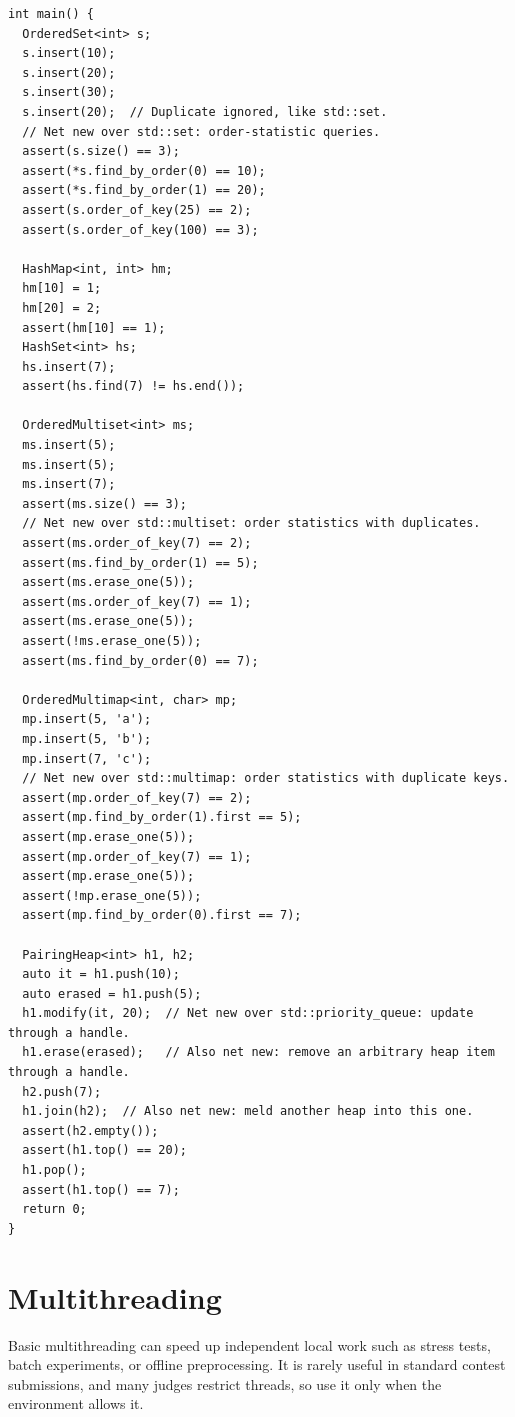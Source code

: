 \begin{lstlisting}[style=cpp]
int main() {
  OrderedSet<int> s;
  s.insert(10);
  s.insert(20);
  s.insert(30);
  s.insert(20);  // Duplicate ignored, like std::set.
  // Net new over std::set: order-statistic queries.
  assert(s.size() == 3);
  assert(*s.find_by_order(0) == 10);
  assert(*s.find_by_order(1) == 20);
  assert(s.order_of_key(25) == 2);
  assert(s.order_of_key(100) == 3);

  HashMap<int, int> hm;
  hm[10] = 1;
  hm[20] = 2;
  assert(hm[10] == 1);
  HashSet<int> hs;
  hs.insert(7);
  assert(hs.find(7) != hs.end());

  OrderedMultiset<int> ms;
  ms.insert(5);
  ms.insert(5);
  ms.insert(7);
  assert(ms.size() == 3);
  // Net new over std::multiset: order statistics with duplicates.
  assert(ms.order_of_key(7) == 2);
  assert(ms.find_by_order(1) == 5);
  assert(ms.erase_one(5));
  assert(ms.order_of_key(7) == 1);
  assert(ms.erase_one(5));
  assert(!ms.erase_one(5));
  assert(ms.find_by_order(0) == 7);

  OrderedMultimap<int, char> mp;
  mp.insert(5, 'a');
  mp.insert(5, 'b');
  mp.insert(7, 'c');
  // Net new over std::multimap: order statistics with duplicate keys.
  assert(mp.order_of_key(7) == 2);
  assert(mp.find_by_order(1).first == 5);
  assert(mp.erase_one(5));
  assert(mp.order_of_key(7) == 1);
  assert(mp.erase_one(5));
  assert(!mp.erase_one(5));
  assert(mp.find_by_order(0).first == 7);

  PairingHeap<int> h1, h2;
  auto it = h1.push(10);
  auto erased = h1.push(5);
  h1.modify(it, 20);  // Net new over std::priority_queue: update through a handle.
  h1.erase(erased);   // Also net new: remove an arbitrary heap item through a handle.
  h2.push(7);
  h1.join(h2);  // Also net new: meld another heap into this one.
  assert(h2.empty());
  assert(h1.top() == 20);
  h1.pop();
  assert(h1.top() == 7);
  return 0;
}
\end{lstlisting}

\section{\texorpdfstring{Multithreading}{8.7 Multithreading}}
\setcounter{section}{7}
\label{sec:8.7}
Basic multithreading can speed up independent local work such as stress tests, batch experiments, or offline preprocessing. It is rarely useful in standard contest submissions, and many judges restrict threads, so use it only when the environment allows it.

